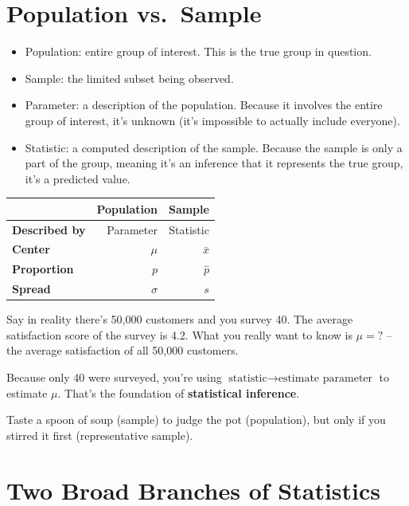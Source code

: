 \documentclass[
  letterpaper,
  DIV=11,
  numbers=noendperiod]{scrreprt}
\newcounter{none} %
\providecommand{\tightlist}{%
  \setlength{\itemsep}{0pt}\setlength{\parskip}{0pt}}
\begin{document}
\section{Population vs.~Sample}\label{population-vs.-sample}

\begin{itemize}
\tightlist
\item
  Population: entire group of interest. This is the true group in
  question.
\item
  Sample: the limited subset being observed.
\item
  Parameter: a description of the population. Because it involves the
  entire group of interest, it's unknown (it's impossible to actually
  include everyone).
\item
  Statistic: a computed description of the sample. Because the sample is
  only a part of the group, meaning it's an inference that it represents
  the true group, it's a predicted value.
\end{itemize}

{\def\LTcaptype{none} %
\begin{longtable}[]{@{}lrr@{}}
\toprule\noalign{}
& Population & Sample \\
\midrule\noalign{}
\endhead
\bottomrule\noalign{}
\endlastfoot
\textbf{Described by} & Parameter & Statistic \\
\textbf{Center} & \(\mu\) & \(\bar{x}\) \\
\textbf{Proportion} & \(p\) & \(\hat{p}\) \\
\textbf{Spread} & \(\sigma\) & \(s\) \\
\end{longtable}
}

Say in reality there's 50,000 customers and you survey 40. The average
satisfaction score of the survey is 4.2. What you really want to know is
\(\mu = ?\) -- the average satisfaction of all 50,000 customers.

Because only 40 were surveyed, you're using
\(\text{statistic} \rightarrow \text{estimate parameter}\) to estimate
\(\mu\). That's the foundation of \textbf{statistical inference}.

Taste a spoon of soup (sample) to judge the pot (population), but only
if you stirred it first (representative sample).

\section{Two Broad Branches of
Statistics}\label{two-broad-branches-of-statistics}
\end{document}
